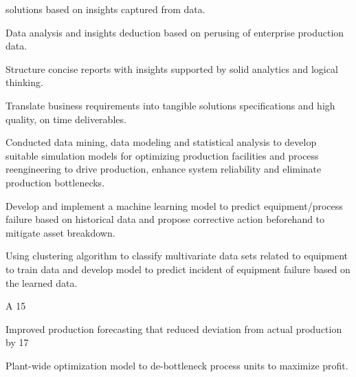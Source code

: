 \documentclass[]{deedy-resume-openfont}
\begin{document}
\begin{minipage}[t]{1\textwidth}
\begin{tightemize}
solutions based on insights captured from data.
\item Data analysis and insights deduction based on perusing of enterprise production data.
\item Structure concise reports with insights supported by solid analytics and logical thinking.
\item Translate business requirements into tangible solutions specifications and high quality, on time
deliverables.
\item Conducted data mining, data modeling and statistical analysis to develop suitable simulation models for optimizing production facilities and process reengineering to drive production, enhance system reliability and eliminate production bottlenecks.
\end{tightemize}


\begin{tightemize}
\item Develop and implement a machine learning model to predict equipment/process failure based on
historical data and propose corrective action beforehand to mitigate asset breakdown.
\item Using clustering algorithm to classify multivariate data sets related to equipment to train data and develop model to predict incident of equipment failure based on the learned data.
\item A 15%
\item Improved production forecasting that reduced deviation from actual production by 17%
\item Plant-wide optimization model to de-bottleneck process units to maximize profit.
\end{tightemize}

\end{minipage}
 
\end{document}
